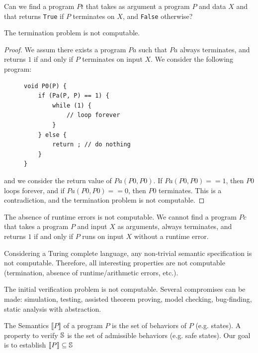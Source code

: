 \documentclass[toc]{../cs-classes/cs-classes}
\begin{document}
\begin{definition}
    Can we find a program $Pt$ that takes as argument a program $P$ and data $X$ and that returns \texttt{True} if $P$ terminates on $X$, and \texttt{False} otherwise?
\end{definition}

\begin{property}
    The termination problem is not computable.
\end{property}
\begin{proof}
    We assum there exists a program $Pa$ such that $Pa$ always terminates, and returns $1$ if and only if $P$ terminates on input $X$. We consider the following program:
    \begin{figure}[H]
    \centering
    \begin{minipage}{0.4\textwidth}
    \begin{verbatim}
void P0(P) {
    if (Pa(P, P) == 1) {
        while (1) {
            // loop forever
        }
    } else {
        return ; // do nothing
    }
}
    \end{verbatim}
    \end{minipage}
    \end{figure}
    \noindent and we consider the return value of $Pa(P0, P0)$. If $Pa(P0, P0) == 1$, then $P0$ loops forever, and if $Pa(P0, P0) == 0$, then $P0$ terminates. This is a contradiction, and the termination problem is not computable.
\end{proof}

\begin{property}
    The absence of runtime errors is not computable. We cannot find a program $Pc$ that takes a program $P$ and input $X$ as arguments, always terminates, and returns $1$ if and only if $P$ runs on input $X$ without a runtime error.
\end{property}

\begin{theorem}
    Considering a Turing complete language, any non-trivial semantic specification is not computable. Therefore, all interesting properties are not computable (termination, absence of runtime/arithmetic errors, etc.).
\end{theorem}

The initial verification problem is not computable. Several compromises can be made: simulation, testing, assisted theorem proving, model checking, bug-finding, static analysis with abstraction.

\begin{definition}
    The Semantics $\llbracket P\rrbracket$ of a program $P$ is the set of behaviors of $P$ (e.g. states). A property to verify $\S$ is the set of admissible behaviors (e.g. safe states). Our goal is to establish $\llbracket P\rrbracket \subseteq \S$
\end{definition}
\end{document}

